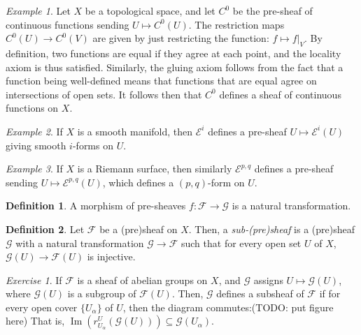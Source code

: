 \documentclass[a4paper]{report}
\theoremstyle{definition}
\newtheorem{definition}{Definition}
\theoremstyle{remark}
\theoremstyle{proposition}
\theoremstyle{conjecture}
\theoremstyle{lemma}
\theoremstyle{corollary}
\theoremstyle{exercise}
\newtheorem{exercise}{Exercise}
\theoremstyle{example}
\newtheorem{example}{Example}
\newcommand{\mcal}{\mathcal}
\newcommand{\on}{\operatorname}
\begin{document}
 \begin{example}
    Let $X$ be a topological space, and let $C^0$ be the 
    pre-sheaf of continuous functions sending $U\mapsto C^0(U)$.
    The restriction maps $C^0(U) \to C^0(V)$ are given by 
    just restricting  the function: $f\mapsto f\vert_V$.
    By definition, two functions are equal if they agree at each point,
    and the locality axiom is thus satisfied. Similarly, the gluing axiom
    follows from the fact that a function being well-defined means that 
    functions that are equal agree on intersections of open sets.
    It follows then that $C^0$ defines a sheaf of continuous functions on 
    $X$.
 \end{example}

 \begin{example}
    If $X$ is a smooth manifold, then $\mcal{E}^i$ 
    defines a pre-sheaf $U\mapsto \mcal{E}^i(U)$ giving smooth 
    $i$-forms on $U$. 
 \end{example}

 \begin{example}
    If $X$ is a Riemann surface, then similarly $\mcal{E}^{p,q}$ defines a
    pre-sheaf sending $U\mapsto \mcal{E}^{p,q}(U)$, which defines a
    $(p,q)$-form on $U$.
 \end{example}

 \begin{definition}
    A morphism of pre-sheaves $f: \mcal{F} \to \mcal{G}$ is a natural 
    transformation. 
 \end{definition}

\begin{definition}
    Let $\mcal{F}$ be a (pre)sheaf on $X$. 
    Then, a \emph{sub-(pre)sheaf} is a (pre)sheaf
    $\mcal{G}$ with a natural transformation $\mcal{G} \to \mcal{F}$ 
    such that for every open set $U$ of $X$, 
    $\mcal{G}(U) \to\mcal{F}(U)$ is injective.
\end{definition}

\begin{exercise}
    If $\mcal{F}$ is a sheaf of abelian groups on $X$, and 
    $\mcal{G}$ assigns $U\mapsto \mcal{G}(U)$, where $\mcal{G}(U)$ 
    is a subgroup of $\mcal{F}(U)$. Then, $\mcal{G}$ defines a 
    subsheaf of $\mcal{F}$ if for every open cover $\lbrace U_\alpha\rbrace$ 
    of $U$, then the diagram commutes:(TODO: put figure here)
    That is, 
    $\on{Im}(r_{U_\alpha}^U(\mcal{G}(U))) \subseteq \mcal{G}(U_\alpha)$.
\end{exercise}
\end{document}
